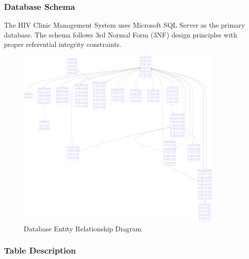 \documentclass[12pt,a4paper]{article}
\begin{document}
\subsubsection{Database Schema}

The HIV Clinic Management System uses Microsoft SQL Server as the primary database. The schema follows 3rd Normal Form (3NF) design principles with proper referential integrity constraints.

\begin{figure}[H]
\centering
\includegraphics[width=0.9\textwidth]{diagrams/database_schema_erd.svg}
\caption{Database Entity Relationship Diagram}
\label{fig:database-schema}
\end{figure}

\subsubsection{Table Description}
\end{document}
